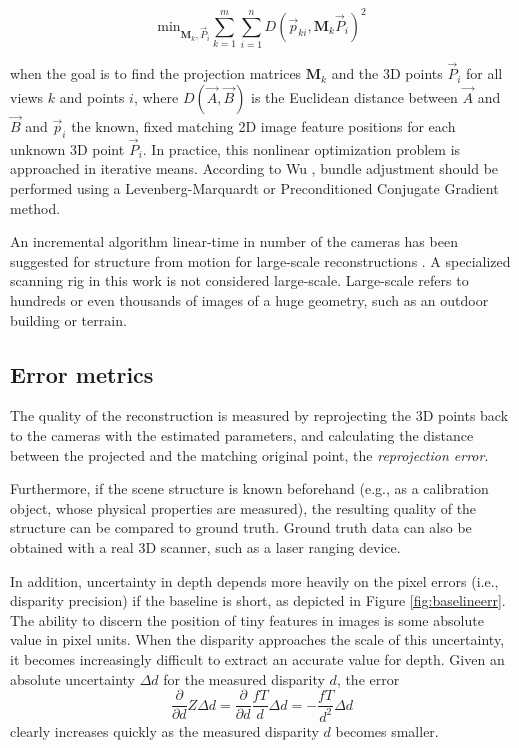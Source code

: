 \begin{equation}
	\text{min}_{\bm M_k, \vec P_i} \sum_{k=1}^m \sum_{i=1}^n D(\vec p_{ki}, \bm M_k \vec P_i)^2
\end{equation}

when the goal is to find the projection matrices $\bm M_k$ and the 3D points $\vec P_i$ for all views $k$ and points $i$, where $D(\vec A,\vec B)$ is the Euclidean distance between $\vec A$ and $\vec B$ and $\vec p_i$ the known, fixed matching 2D image feature positions for each unknown 3D point $\vec P_i$.
In practice, this nonlinear optimization problem is approached in iterative means.
According to Wu \cite{wu2013towards}, bundle adjustment should be performed using a Levenberg-Marquardt or Preconditioned Conjugate Gradient method.

An incremental algorithm linear-time in number of the cameras has been suggested for structure from motion for large-scale reconstructions \cite{wu2013towards}.
A specialized scanning rig in this work is not considered large-scale.
Large-scale refers to hundreds or even thousands of images of a huge geometry, such as an outdoor building or terrain.


\subsection{Error metrics} %

The quality of the reconstruction is measured by reprojecting the 3D points back to the cameras with the estimated parameters, and calculating the distance between the projected and the matching original point, the \emph{reprojection error}. \cite{hartley03multiview}

Furthermore, if the scene structure is known beforehand (e.g., as a calibration object, whose physical properties are measured), the resulting quality of the structure can be compared to ground truth.
Ground truth data can also be obtained with a real 3D scanner, such as a laser ranging device. %

In addition, uncertainty in depth depends more heavily on the pixel errors (i.e., disparity precision) if the baseline is short, as depicted in Figure \ref{fig:baselineerr}.
The ability to discern the position of tiny features in images is some absolute value in pixel units.
When the disparity approaches the scale of this uncertainty, it becomes increasingly difficult to extract an accurate value for depth.
Given an absolute uncertainty $\Delta d$ for the measured disparity $d$, the error
\begin{equation}
	\frac{\partial}{\partial d} Z \Delta d =
	\frac{\partial}{\partial d} \frac{fT}{d} \Delta d =
	-\frac{fT}{d^2} \Delta d
\end{equation}
clearly increases quickly as the measured disparity $d$ becomes smaller.

